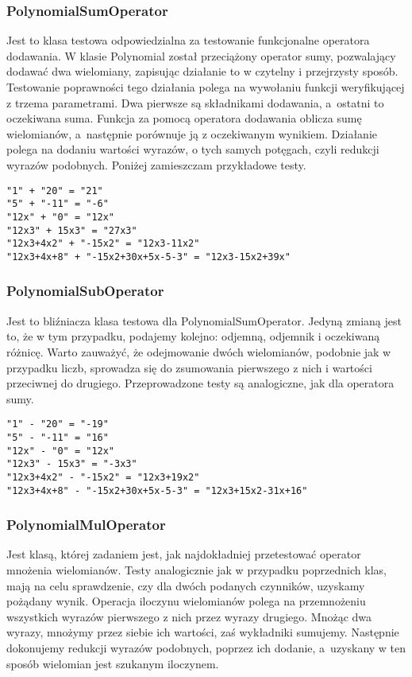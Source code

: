 \subsubsection{PolynomialSumOperator}

Jest to klasa testowa odpowiedzialna za testowanie funkcjonalne operatora dodawania. W klasie Polynomial został przeciążony operator sumy, pozwalający dodawać dwa wielomiany, zapisując działanie to w czytelny i przejrzysty sposób. Testowanie poprawności tego działania polega na wywołaniu funkcji weryfikującej z trzema parametrami. Dwa pierwsze są składnikami dodawania, a~ostatni to oczekiwana suma. Funkcja za pomocą operatora dodawania oblicza sumę wielomianów, a~następnie porównuje ją z oczekiwanym wynikiem. Działanie polega na dodaniu wartości wyrazów, o tych samych potęgach, czyli redukcji wyrazów podobnych. Poniżej zamieszczam przykładowe testy.

\begin{lstlisting}
"1" + "20" = "21"
"5" + "-11" = "-6"
"12x" + "0" = "12x"
"12x3" + 15x3" = "27x3"
"12x3+4x2" + "-15x2" = "12x3-11x2"
"12x3+4x+8" + "-15x2+30x+5x-5-3" = "12x3-15x2+39x"
\end{lstlisting}

\subsubsection{PolynomialSubOperator}

Jest to bliźniacza klasa testowa dla PolynomialSumOperator. Jedyną zmianą jest to, że w tym przypadku, podajemy kolejno: odjemną, odjemnik i oczekiwaną różnicę. Warto zauważyć, że odejmowanie dwóch wielomianów, podobnie jak w przypadku liczb, sprowadza się do zsumowania pierwszego z nich i wartości przeciwnej do drugiego. Przeprowadzone testy są analogiczne, jak dla operatora sumy.

\begin{lstlisting}
"1" - "20" = "-19"
"5" - "-11" = "16"
"12x" - "0" = "12x"
"12x3" - 15x3" = "-3x3"
"12x3+4x2" - "-15x2" = "12x3+19x2"
"12x3+4x+8" - "-15x2+30x+5x-5-3" = "12x3+15x2-31x+16"
\end{lstlisting}

\subsubsection{PolynomialMulOperator}

Jest klasą, której zadaniem jest, jak najdokładniej przetestować operator mnożenia wielomianów. Testy analogicznie jak w przypadku poprzednich klas, mają na celu sprawdzenie, czy dla dwóch podanych czynników, uzyskamy pożądany wynik. Operacja iloczynu wielomianów polega na przemnożeniu wszystkich wyrazów pierwszego z nich przez wyrazy drugiego. Mnożąc dwa wyrazy, mnożymy przez siebie ich wartości, zaś wykładniki sumujemy. Następnie dokonujemy redukcji wyrazów podobnych, poprzez ich dodanie, a~uzyskany w ten sposób wielomian jest szukanym iloczynem.


